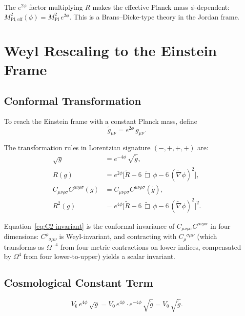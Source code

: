 \documentclass[11pt,a4paper]{article}
\newcommand{\Rsq}{R^2}
\newcommand{\Weylsq}{C_{\mu\nu\rho\sigma}C^{\mu\nu\rho\sigma}}
\theoremstyle{plain}
\theoremstyle{definition}
\begin{document}
The $e^{2\phi}$ factor multiplying $R$ makes the effective Planck mass
$\phi$-dependent:
$M_{\mathrm{Pl,eff}}^2(\phi) = M_{\mathrm{Pl}}^2\,e^{2\phi}$.
This is a Brans--Dicke-type theory in the Jordan frame.

\section{Weyl Rescaling to the Einstein Frame}\label{sec:einstein}

\subsection{Conformal Transformation}

To reach the Einstein frame with a constant Planck mass, define
\begin{equation}\label{eq:weyl}
  \tilde{g}_{\mu\nu} = e^{2\phi}\,g_{\mu\nu}.
\end{equation}

The transformation rules in Lorentzian signature $(-,+,+,+)$ are:
\begin{align}
  \sqrt{g} &= e^{-4\phi}\,\sqrt{\tilde{g}},
  \label{eq:vol-transform}\\
  R(g) &= e^{2\phi}\bigl[
    \tilde{R} - 6\,\tilde{\Box}\,\phi
    - 6\,(\tilde{\nabla}\phi)^2\bigr],
  \label{eq:R-transform}\\
  \Weylsq(g) &= \Weylsq(\tilde{g}),
  \label{eq:C2-invariant}\\
  \Rsq(g) &= e^{4\phi}\bigl[
    \tilde{R} - 6\,\tilde{\Box}\,\phi
    - 6\,(\tilde{\nabla}\phi)^2\bigr]^2.
  \label{eq:R2-transform}
\end{align}

Equation~\eqref{eq:C2-invariant} is the conformal invariance of
$C_{\mu\nu\rho\sigma}C^{\mu\nu\rho\sigma}$ in four dimensions:
$C^{\rho}{}_{\sigma\mu\nu}$ is Weyl-invariant, and contracting with
$C_{\rho}{}^{\sigma\mu\nu}$ (which transforms as $\Omega^{-4}$ from
four metric contractions on lower indices, compensated by $\Omega^4$
from four lower-to-upper) yields a scalar invariant.

\subsection{Cosmological Constant Term}

\begin{equation}\label{eq:S0-einstein}
  V_0\,e^{4\phi}\,\sqrt{g}
  = V_0\,e^{4\phi}\cdot e^{-4\phi}\,\sqrt{\tilde{g}}
  = V_0\,\sqrt{\tilde{g}}.
\end{equation}
\end{document}
